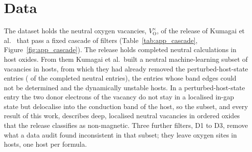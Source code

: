 \section{Data}
\label{app:data}

The dataset holds the neutral oxygen vacancies, $V_\mathrm{O}^{\times}$, of the release of Kumagai et al.\ \citep{Kumagai2021insights} that pass a fixed cascade of filters (Table~\ref{tab:app_cascade}, Figure~\ref{fig:app_cascade}). The release holds \numFilterCascadeStepsReleaseSites{} completed neutral calculations in \numFilterCascadeStepsReleaseHosts{} host oxides. From them Kumagai et al.\ built a neutral machine-learning subset of \numFilterCascadeStepsMlSubsetSites{} vacancies in \numFilterCascadeStepsMlSubsetHosts{} hosts, from which they had already removed the perturbed-host-state entries (\numScreeningAbsenceReleaseNeutralCompletedPhs{} of the completed neutral entries), the entries whose band edges could not be determined and the dynamically unstable hosts. In a perturbed-host-state entry the two donor electrons of the vacancy do not stay in a localised in-gap state but delocalise into the conduction band of the host, so the subset, and every result of this work, describes deep, localised neutral vacancies in ordered oxides that the release classifies as non-magnetic. Three further filters, D1 to D3, remove what a data audit found inconsistent in that subset; they leave \numFilterCascadeStepsFinalSites{} oxygen sites in \numFilterCascadeStepsFinalHosts{} hosts, one host per formula.

